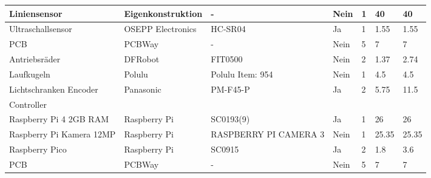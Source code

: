 \documentclass[main.tex]{subfiles} %
\begin{document}
\begin{table}[h]
\begin{tabular}{|p{3cm}|p{2.5cm}|p{3cm}|p{1cm}|p{1cm}|p{1.5cm}|p{1cm}|}
        Liniensensor                           & Eigenkonstruktion     & -                       & Nein            & 1              & 40                        & 40                          \\ \hline
        Ultraschallsensor                      & OSEPP Electronics     & HC-SR04                 & Ja              & 1              & 1.55                      & 1.55                        \\ \hline
        PCB                                    & PCBWay                & -                       & Nein            & 5              & 7                         & 7                           \\ \hline
        Antriebsräder                          & DFRobot               & FIT0500                 & Nein            & 2              & 1.37                      & 2.74                        \\ \hline
        Laufkugeln                             & Polulu                & Polulu Item: 954        & Nein            & 1              & 4.5                       & 4.5                         \\ \hline
        Lichtschranken Encoder                 & Panasonic             & PM-F45-P                & Ja              & 2              & 5.75                      & 11.5                        \\ \hline
        \rowcolor{lightgray} Controller        &                       &                         &                 &                &                           &                             \\ \hline
        Raspberry Pi 4 2GB RAM                 & Raspberry Pi          & SC0193(9)               & Ja              & 1              & 26                        & 26                          \\ \hline
        Raspberry Pi Kamera 12MP               & Raspberry Pi          & RASPBERRY PI CAMERA 3   & Nein            & 1              & 25.35                     & 25.35                       \\ \hline
        Raspberry Pico                         & Raspberry Pi          & SC0915                  & Ja              & 2              & 1.8                       & 3.6                         \\ \hline
        PCB                                    & PCBWay                & -                       & Nein            & 5              & 7                         & 7                           \\ \hline

\end{tabular}
\end{table}
\end{document}
